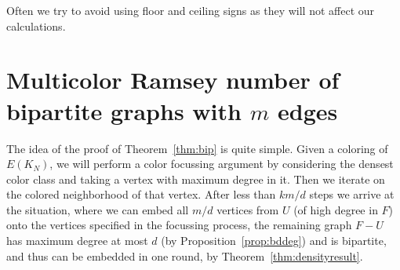 \documentclass[reqno]{amsart}
\theoremstyle{remark}
\begin{document}
Often we try to avoid using  floor and ceiling signs as they will not affect our calculations.

\section{Multicolor Ramsey number of bipartite graphs with \texorpdfstring{$m$}{m} edges}\label{sec:bip}
The idea of the proof of Theorem~\ref{thm:bip} is quite simple. Given a coloring of $E(K_N)$, we will perform a color focussing argument by 
considering the densest color class and taking a vertex with maximum degree in it. 
Then we  iterate on the colored neighborhood of that vertex. 
 After less than $km/d$ steps we arrive at the situation, where we can embed 
 all $m/d$  vertices from $U$ (of high degree in $F$) onto the vertices specified in 
the focussing process, the remaining graph $F-U$ has maximum degree at most $d$ (by Proposition~\ref{prop:bddeg}) and is bipartite, 
and thus can be embedded in one round, by Theorem~\ref{thm:densityresult}.
\end{document}
